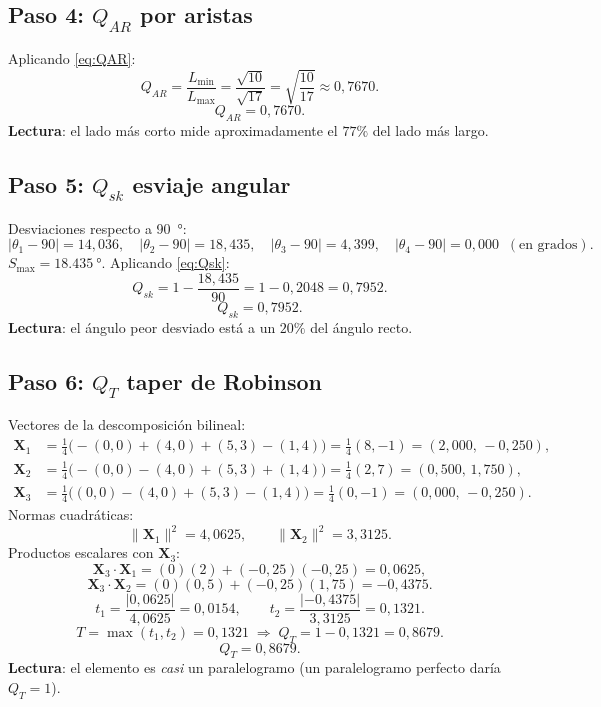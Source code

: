 \documentclass[11pt,a4paper]{article}
\begin{document}
\subsection{Paso 4: $Q_{AR}$ por aristas}

Aplicando \eqref{eq:QAR}:
\[
  Q_{AR} = \frac{L_{\min}}{L_{\max}} = \frac{\sqrt{10}}{\sqrt{17}}
         = \sqrt{\frac{10}{17}} \approx 0{,}7670.
\]
\[
  \boxed{\;Q_{AR} = 0{,}7670.\;}
\]
\textbf{Lectura}: el lado m\'as corto mide aproximadamente el $77\%$ del lado m\'as largo.

\subsection{Paso 5: $Q_{sk}$ esviaje angular}

Desviaciones respecto a \SI{90}{\degree}:
\[
  |\theta_1-90| \!=\! 14{,}036,\quad
  |\theta_2-90| \!=\! 18{,}435,\quad
  |\theta_3-90| \!=\!  4{,}399,\quad
  |\theta_4-90| \!=\!  0{,}000\;\;(\text{en grados}).
\]
$S_{\max}=\SI{18,435}{\degree}$. Aplicando \eqref{eq:Qsk}:
\[
  Q_{sk} = 1 - \frac{18{,}435}{90} = 1 - 0{,}2048 = 0{,}7952.
\]
\[
  \boxed{\;Q_{sk} = 0{,}7952.\;}
\]
\textbf{Lectura}: el \'angulo peor desviado est\'a a un $20\%$ del \'angulo recto.

\subsection{Paso 6: $Q_T$ taper de Robinson}

Vectores de la descomposici\'on bilineal:
\begin{align*}
  \bm{X}_1 &= \tfrac{1}{4}\bigl(-(0,0)+(4,0)+(5,3)-(1,4)\bigr) = \tfrac{1}{4}(8,-1) = (2{,}000,\,-0{,}250),\\
  \bm{X}_2 &= \tfrac{1}{4}\bigl(-(0,0)-(4,0)+(5,3)+(1,4)\bigr) = \tfrac{1}{4}(2,7) = (0{,}500,\,1{,}750),\\
  \bm{X}_3 &= \tfrac{1}{4}\bigl((0,0)-(4,0)+(5,3)-(1,4)\bigr) = \tfrac{1}{4}(0,-1) = (0{,}000,\,-0{,}250).
\end{align*}
Normas cuadr\'aticas:
\[
  \lVert\bm{X}_1\rVert^2 = 4{,}0625, \qquad \lVert\bm{X}_2\rVert^2 = 3{,}3125.
\]
Productos escalares con $\bm{X}_3$:
\[
  \bm{X}_3\!\cdot\!\bm{X}_1 = (0)(2)+(-0{,}25)(-0{,}25) = 0{,}0625,
\]
\[
  \bm{X}_3\!\cdot\!\bm{X}_2 = (0)(0{,}5)+(-0{,}25)(1{,}75) = -0{,}4375.
\]
\[
  t_1 = \frac{|0{,}0625|}{4{,}0625} = 0{,}0154, \qquad
  t_2 = \frac{|-0{,}4375|}{3{,}3125} = 0{,}1321.
\]
\[
  T = \max(t_1,t_2) = 0{,}1321 \;\Rightarrow\; Q_T = 1 - 0{,}1321 = 0{,}8679.
\]
\[
  \boxed{\;Q_T = 0{,}8679.\;}
\]
\textbf{Lectura}: el elemento es \emph{casi} un paralelogramo (un paralelogramo perfecto dar\'ia
$Q_T=1$).
\end{document}
